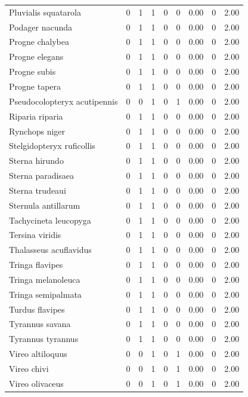 \documentclass[
]{scrbook}
\begin{document}
\begin{table}
\begin{tabular}{lrrrrrrrr}
Pluvialis squatarola & 0 & 1 & 1 & 0 & 0 & 0.00 & 0 & 2.00\\
Podager nacunda & 0 & 1 & 1 & 0 & 0 & 0.00 & 0 & 2.00\\
Progne chalybea & 0 & 1 & 1 & 0 & 0 & 0.00 & 0 & 2.00\\
Progne elegans & 0 & 1 & 1 & 0 & 0 & 0.00 & 0 & 2.00\\
\addlinespace
Progne subis & 0 & 1 & 1 & 0 & 0 & 0.00 & 0 & 2.00\\
Progne tapera & 0 & 1 & 1 & 0 & 0 & 0.00 & 0 & 2.00\\
Pseudocolopteryx acutipennis & 0 & 0 & 1 & 0 & 1 & 0.00 & 0 & 2.00\\
Riparia riparia & 0 & 1 & 1 & 0 & 0 & 0.00 & 0 & 2.00\\
Rynchops niger & 0 & 1 & 1 & 0 & 0 & 0.00 & 0 & 2.00\\
\addlinespace
Stelgidopteryx ruficollis & 0 & 1 & 1 & 0 & 0 & 0.00 & 0 & 2.00\\
Sterna hirundo & 0 & 1 & 1 & 0 & 0 & 0.00 & 0 & 2.00\\
Sterna paradisaea & 0 & 1 & 1 & 0 & 0 & 0.00 & 0 & 2.00\\
Sterna trudeaui & 0 & 1 & 1 & 0 & 0 & 0.00 & 0 & 2.00\\
Sternula antillarum & 0 & 1 & 1 & 0 & 0 & 0.00 & 0 & 2.00\\
\addlinespace
Tachycineta leucopyga & 0 & 1 & 1 & 0 & 0 & 0.00 & 0 & 2.00\\
Tersina viridis & 0 & 1 & 1 & 0 & 0 & 0.00 & 0 & 2.00\\
Thalasseus acuflavidus & 0 & 1 & 1 & 0 & 0 & 0.00 & 0 & 2.00\\
Tringa flavipes & 0 & 1 & 1 & 0 & 0 & 0.00 & 0 & 2.00\\
Tringa melanoleuca & 0 & 1 & 1 & 0 & 0 & 0.00 & 0 & 2.00\\
\addlinespace
Tringa semipalmata & 0 & 1 & 1 & 0 & 0 & 0.00 & 0 & 2.00\\
Turdus flavipes & 0 & 1 & 1 & 0 & 0 & 0.00 & 0 & 2.00\\
Tyrannus savana & 0 & 1 & 1 & 0 & 0 & 0.00 & 0 & 2.00\\
Tyrannus tyrannus & 0 & 1 & 1 & 0 & 0 & 0.00 & 0 & 2.00\\
Vireo altiloquus & 0 & 0 & 1 & 0 & 1 & 0.00 & 0 & 2.00\\
\addlinespace
Vireo chivi & 0 & 0 & 1 & 0 & 1 & 0.00 & 0 & 2.00\\
Vireo olivaceus & 0 & 0 & 1 & 0 & 1 & 0.00 & 0 & 2.00\\

\end{tabular}
\end{table}
\end{document}
